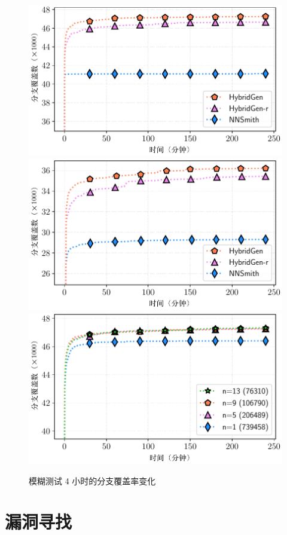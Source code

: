 \begin{figure}
    \centering
        {\includegraphics[width=0.48\linewidth]{figures/pt_cov.pdf}}
        {\includegraphics[width=0.48\linewidth]{figures/tf_cov.pdf}}
        {\includegraphics[width=0.48\linewidth]{figures/size_cov.pdf}}
    \caption{模糊测试 4 小时的分支覆盖率变化}
    \label{fig:covexp}
\end{figure}


\section{漏洞寻找}

